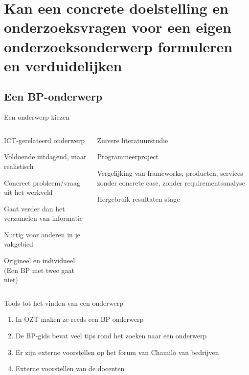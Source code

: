 \documentclass{beamer}
\begin{document}
\section{Kan een concrete doelstelling en onderzoeksvragen voor een eigen onderzoeksonderwerp formuleren en verduidelijken}

\sectionframelogo{}

\subsection{Een BP-onderwerp}
\begin{frame}{Een onderwerp kiezen}
	
	\begin{columns}[c]


		\begin{itemize}
			\item \textcolor{HoGentAccent3}{ICT-gerelateerd onderwerp
			\item Voldoende uitdagend, maar realistisch
			\item Concreet probleem/vraag uit het werkveld
			\item Gaat verder dan het verzamelen van informatie
			\item Nuttig voor anderen in je vakgebied
			\item Origineel en individueel (Een BP met twee gaat niet)}
		\end{itemize}
	
	
	

	\begin{itemize}
		\item \textcolor{HoGentAccent2}{Zuivere literatuurstudie
		\item Programmeerproject
		\item Vergelijking van frameworks, producten, services zonder
		concrete case, zonder requirementsanalyse
		\item  Hergebruik resultaten stage}
	\end{itemize}
		
	\end{columns}	
	
\end{frame}


\begin{frame}{Tools tot het vinden van een onderwerp}
	\begin{enumerate}
		\item In OZT maken ze reeds een BP onderwerp
		\item De BP-gids bevat veel tips rond het zoeken naar een onderwerp
		\item Er zijn externe voorstellen op het forum van Chamilo van bedrijven
		\item \textcolor{HoGentAccent1}{Externe voorstellen van de docenten}
	\end{enumerate}
\end{frame}
\end{document}

